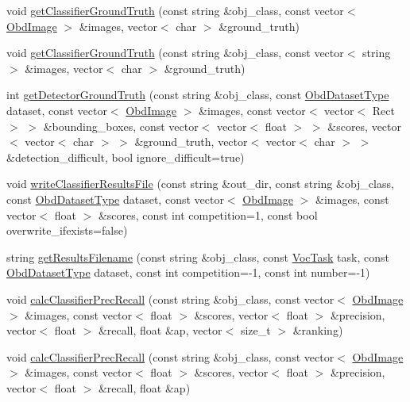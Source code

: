 \begin{DoxyCompactItemize}
\item 
void \hyperlink{classVocData_ab9527dd6557bf03b8fd253ae0066fa37}{get\-Classifier\-Ground\-Truth} (const string \&obj\-\_\-class, const vector$<$ \hyperlink{classObdImage}{Obd\-Image} $>$ \&images, vector$<$ char $>$ \&ground\-\_\-truth)
\item 
void \hyperlink{classVocData_ab90b59b732020d531a83bdf5afde7459}{get\-Classifier\-Ground\-Truth} (const string \&obj\-\_\-class, const vector$<$ string $>$ \&images, vector$<$ char $>$ \&ground\-\_\-truth)
\item 
int \hyperlink{classVocData_a95d562193b551c733fba22d2ca9fab3e}{get\-Detector\-Ground\-Truth} (const string \&obj\-\_\-class, const \hyperlink{bagofwords__classification_8cpp_a769a10790da271430ddd42e42073a0ea}{Obd\-Dataset\-Type} dataset, const vector$<$ \hyperlink{classObdImage}{Obd\-Image} $>$ \&images, const vector$<$ vector$<$ Rect $>$ $>$ \&bounding\-\_\-boxes, const vector$<$ vector$<$ float $>$ $>$ \&scores, vector$<$ vector$<$ char $>$ $>$ \&ground\-\_\-truth, vector$<$ vector$<$ char $>$ $>$ \&detection\-\_\-difficult, bool ignore\-\_\-difficult=true)
\item 
void \hyperlink{classVocData_a440a1a9cfd6e9ca080ce338f5c8a047d}{write\-Classifier\-Results\-File} (const string \&out\-\_\-dir, const string \&obj\-\_\-class, const \hyperlink{bagofwords__classification_8cpp_a769a10790da271430ddd42e42073a0ea}{Obd\-Dataset\-Type} dataset, const vector$<$ \hyperlink{classObdImage}{Obd\-Image} $>$ \&images, const vector$<$ float $>$ \&scores, const int competition=1, const bool overwrite\-\_\-ifexists=false)
\item 
string \hyperlink{classVocData_a50835c8bd8628e0d1ca61e3b3e8bc189}{get\-Results\-Filename} (const string \&obj\-\_\-class, const \hyperlink{bagofwords__classification_8cpp_a8453e90c379aabdea39070a17a9f63e2}{Voc\-Task} task, const \hyperlink{bagofwords__classification_8cpp_a769a10790da271430ddd42e42073a0ea}{Obd\-Dataset\-Type} dataset, const int competition=-\/1, const int number=-\/1)
\item 
void \hyperlink{classVocData_ac6dc007f256c36d8fe6ef395ed39dd8a}{calc\-Classifier\-Prec\-Recall} (const string \&obj\-\_\-class, const vector$<$ \hyperlink{classObdImage}{Obd\-Image} $>$ \&images, const vector$<$ float $>$ \&scores, vector$<$ float $>$ \&precision, vector$<$ float $>$ \&recall, float \&ap, vector$<$ size\-\_\-t $>$ \&ranking)
\item 
void \hyperlink{classVocData_aa1a71e116eabd997fe6fd76d0abe70a8}{calc\-Classifier\-Prec\-Recall} (const string \&obj\-\_\-class, const vector$<$ \hyperlink{classObdImage}{Obd\-Image} $>$ \&images, const vector$<$ float $>$ \&scores, vector$<$ float $>$ \&precision, vector$<$ float $>$ \&recall, float \&ap)

\end{DoxyCompactItemize}
